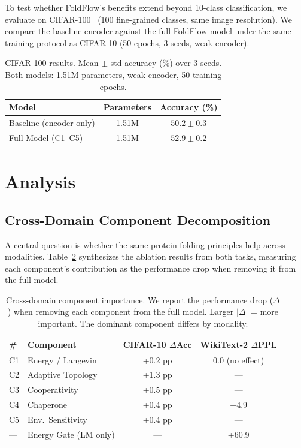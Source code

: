 \documentclass[10pt]{article}
\begin{document}
To test whether FoldFlow's benefits extend beyond 10-class
classification, we evaluate on CIFAR-100~\citep{krizhevsky2009cifar}
(100 fine-grained classes, same image resolution).  We compare the
baseline encoder against the full FoldFlow model under the same
training protocol as CIFAR-10 (50 epochs, 3 seeds, weak encoder).

\begin{table}[t]
\centering
\caption{CIFAR-100 results.  Mean $\pm$ std accuracy (\%) over 3 seeds.
  Both models: 1.51M parameters, weak encoder, 50 training epochs.}
\label{tab:cifar100}
\small
\begin{tabular}{@{}lcc@{}}
\toprule
Model & Parameters & Accuracy (\%) \\
\midrule
Baseline (encoder only) & 1.51M & $50.2 \pm 0.3$ \\
Full Model (C1--C5)     & 1.51M & $\mathbf{52.9 \pm 0.2}$ \\
\bottomrule
\end{tabular}
\end{table}

\section{Analysis}
\label{sec:analysis}

\subsection{Cross-Domain Component Decomposition}
\label{sec:cross_domain}

A central question is whether the same protein folding principles help
across modalities.  Table~\ref{tab:cross_domain} synthesizes the
ablation results from both tasks, measuring each component's
contribution as the performance drop when removing it from the full
model.

\begin{table}[t]
\centering
\caption{Cross-domain component importance.  We report the
  performance drop ($\Delta$) when removing each component from the
  full model.  Larger $|\Delta|$ = more important.  The dominant
  component differs by modality.}
\label{tab:cross_domain}
\small
\begin{tabular}{@{}llcc@{}}
\toprule
\# & Component & CIFAR-10 $\Delta$Acc & WikiText-2 $\Delta$PPL \\
\midrule
C1 & Energy / Langevin    & +0.2 pp  & 0.0 (no effect) \\
C2 & Adaptive Topology    & +1.3 pp  & --- \\
C3 & Cooperativity        & +0.5 pp  & --- \\
C4 & Chaperone            & +0.4 pp  & +4.9 \\
C5 & Env.\ Sensitivity    & +0.4 pp  & --- \\
--- & Energy Gate (LM only) & --- & +60.9 \\
\bottomrule
\end{tabular}
\end{table}
\end{document}
